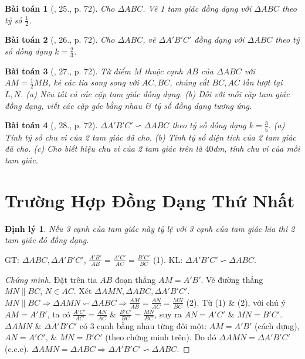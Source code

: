 \documentclass{article}
\newtheorem{baitoan}{Bài toán}
\newtheorem{dinhly}{Định lý}
\begin{document}
\begin{baitoan}[\cite{SGK_Toan_8_tap_2}, 25., p. 72]
	Cho $\Delta ABC$. Vẽ 1 tam giác đồng dạng với $\Delta ABC$ theo tỷ số $\frac{1}{2}$.
\end{baitoan}

\begin{baitoan}[\cite{SGK_Toan_8_tap_2}, 26., p. 72]
	Cho $\Delta ABC$, vẽ $\Delta A'B'C'$ đồng dạng với $\Delta ABC$ theo tỷ số đồng dạng $k = \frac{2}{3}$.
\end{baitoan}

\begin{baitoan}[\cite{SGK_Toan_8_tap_2}, 27., p. 72]
	Từ điểm $M$ thuộc cạnh $AB$ của $\Delta ABC$ với $AM = \frac{1}{2}MB$, kẻ các tia song song với $AC,BC$, chúng cắt $BC,AC$ lần lượt tại $L,N$. (a) Nêu tất cả các cặp tam giác đồng dạng. (b) Đối với mỗi cặp tam giác đồng dạng, viết các cặp góc bằng nhau \& tỷ số đồng dạng tương ứng.	
\end{baitoan}

\begin{baitoan}[\cite{SGK_Toan_8_tap_2}, 28., p. 72]
	$\Delta A'B'C'\backsim\Delta ABC$ theo tỷ số đồng dạng $k = \frac{3}{5}$. (a) Tính tỷ số chu vi của 2 tam giác đã cho. (b) Tính tỷ số diện tích của 2 tam giác đã cho. (c) Cho biết hiệu chu vi của 2 tam giác trên là $40$\emph{dm}, tính chu vi của mỗi tam giác.
\end{baitoan}


\section{Trường Hợp Đồng Dạng Thứ Nhất}

\begin{dinhly}
	Nếu 3 cạnh của tam giác này tỷ lệ với 3 cạnh của tam giác kia thì 2 tam giác đó đồng dạng.
\end{dinhly}
GT: $\Delta ABC,\Delta A'B'C'$, $\frac{A'B'}{AB} = \frac{A'C'}{AC} = \frac{B'C'}{BC}$ (1). KL: $\Delta A'B'C'\backsim\Delta ABC$.

\begin{proof}[Chứng minh]
	Đặt trên tia $AB$ đoạn thẳng $AM = A'B'$. Vẽ đường thẳng $MN\parallel BC$, $N\in AC$. Xét $\Delta AMN,\Delta ABC,\Delta A'B'C'$. $MN\parallel BC\Rightarrow\Delta AMN\backsim\Delta ABC\Rightarrow\frac{AM}{AB} = \frac{AN}{AC} = \frac{MN}{BC}$ (2). Từ (1) \& (2), với chú ý $AM = A'B'$, ta có $\frac{A'C'}{AC} = \frac{AN}{AC}$ \& $\frac{B'C'}{BC} = \frac{MN}{BC}$, suy ra $AN = A'C'$ \& $MN = B'C'$. $\Delta AMN$ \& $\Delta A'B'C'$ có 3 cạnh bằng nhau từng đôi một: $AM = A'B'$ (cách dựng), $AN = A'C'$, \& $MN = B'C'$ (theo chứng minh trên). Do đó $\Delta AMN = \Delta A'B'C'$ (c.c.c). $\Delta AMN = \Delta ABC\Rightarrow\Delta A'B'C'\backsim\Delta ABC$.
\end{proof}
\end{document}
